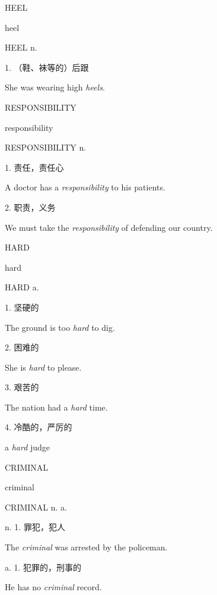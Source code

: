 \begin{flashcard}{
HEEL

heel
}
\begin{center}
HEEL n. \textipa{[hi\textlengthmark l]}
\end{center}
1. （鞋、袜等的）后跟

She was wearing high \textit{heels}.

\end{flashcard}
\begin{flashcard}{
RESPONSIBILITY

responsibility
}
\begin{center}
RESPONSIBILITY n. 
\end{center}
1. 责任，责任心

A doctor has a \textit{responsibility} to his patients.

2. 职责，义务

We must take the \textit{responsibility} of defending our country.

\end{flashcard}
\begin{flashcard}{
HARD

hard
}
\begin{center}
HARD a. 
\end{center}
1. 坚硬的

The ground is too \textit{hard} to dig.

2. 困难的

She is \textit{hard} to please.

3. 艰苦的

The nation had a \textit{hard} time.

4. 冷酷的，严厉的

a \textit{hard} judge

\end{flashcard}
\begin{flashcard}{
CRIMINAL

criminal
}
\begin{center}
CRIMINAL n. a. 
\end{center}
n. 1. 罪犯，犯人

The \textit{criminal} was arrested by the policeman.

a. 1. 犯罪的，刑事的

He has no \textit{criminal} record.

\end{flashcard}
